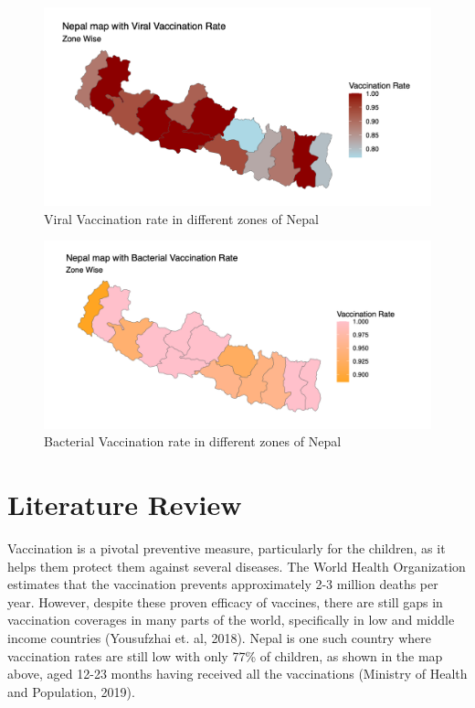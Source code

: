 \documentclass[12pt]{article}
\begin{document}
\begin{figure}[h]
    \centering
    \includegraphics[width=1\textwidth]{viral.png}
    \caption{Viral Vaccination rate in different zones of Nepal}
    \label{Viral Vaccination rate in different zones of Nepal}
\end{figure}

\begin{figure}[h]
    \centering
    \includegraphics[width=1\textwidth]{bacterial.png}
    \caption{Bacterial Vaccination rate in different zones of Nepal}
    \label{Bacterial Vaccination rate in different zones of Nepal}
\end{figure}

\section{Literature Review}
Vaccination is a pivotal preventive measure, particularly for the children, as it helps them protect them against several diseases. The World Health Organization estimates that the vaccination prevents approximately 2-3 million deaths per year. However, despite these proven efficacy of vaccines, there are still gaps in vaccination coverages in many parts of the world, specifically in low and middle income countries (Yousufzhai et. al, 2018). Nepal is one such country where vaccination rates are still low with only 77\% of children, as shown in the map above, aged 12-23 months having received all the vaccinations (Ministry of Health and Population, 2019).
\end{document}
